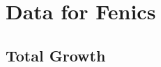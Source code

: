 \documentclass{beamer}
\begin{document}
\section{Data for Fenics}
\subsection{Total Growth}

%
\end{document}
